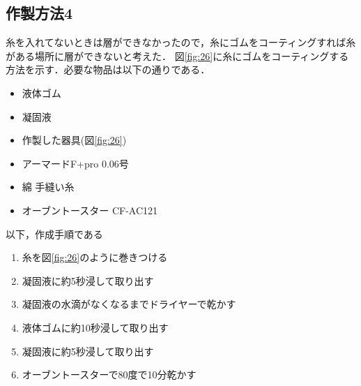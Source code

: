 \subsection{作製方法4}
糸を入れてないときは層ができなかったので，糸にゴムをコーティングすれば糸がある場所に層ができないと考えた．
図\ref{fig:26}に糸にゴムをコーティングする方法を示す．必要な物品は以下の通りである．
\begin{itemize}
  \item 液体ゴム
  \item 凝固液
  \item 作製した器具(図\ref{fig:26})
  \item アーマードF+pro 0.06号
  \item 綿 手縫い糸
  \item オーブントースター CF-AC121
\end{itemize}
以下，作成手順である
\begin{enumerate}
  \item 糸を図\ref{fig:26}のように巻きつける
  \item 凝固液に約5秒浸して取り出す
  \item 凝固液の水滴がなくなるまでドライヤーで乾かす
  \item 液体ゴムに約10秒浸して取り出す
  \item 凝固液に約5秒浸して取り出す
  \item オーブントースターで80度で10分乾かす
\end{enumerate}

